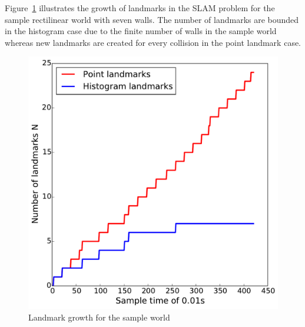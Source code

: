 Figure~\ref{num_landmark} illustrates the growth of landmarks in the SLAM problem for the sample rectilinear world with seven walls. The number of landmarks are bounded in the histogram case due to the finite number of walls in the sample world whereas new landmarks are created for every collision in the point landmark case.
\begin{figure}
\centering
\includegraphics[scale=0.5]{./images/num_landmark}
\caption[Growth of landmarks for different landmark representations]{Landmark growth for the sample world}
\label{num_landmark}
\end{figure}

